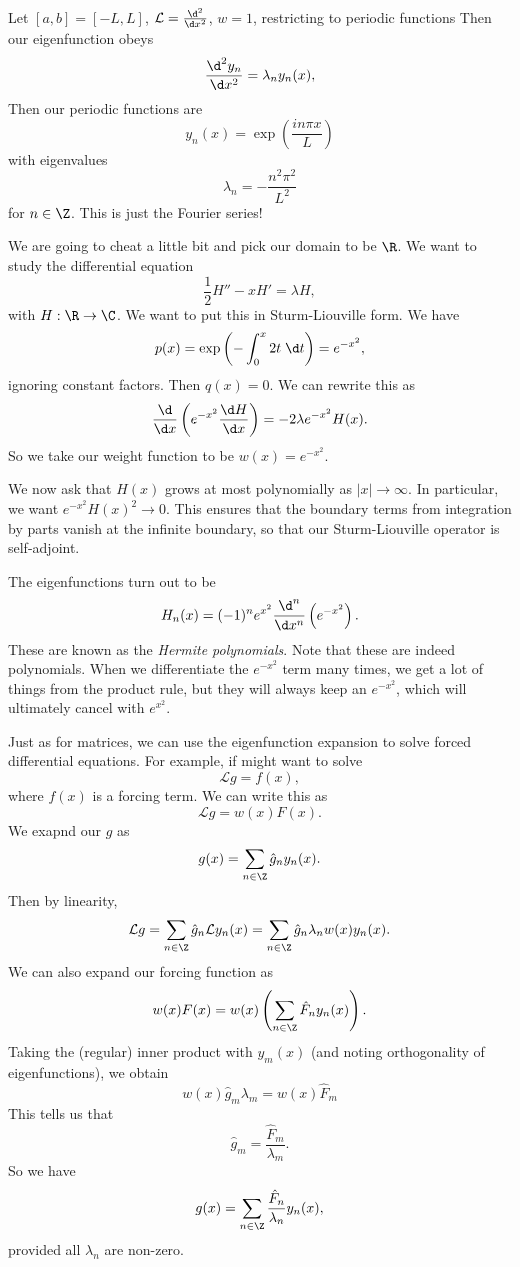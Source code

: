 \documentclass[a4paper]{article}
\begin{document}
\begin{eg}
  Let $[a, b] = [-L, L]$, $\mathcal{L} = \frac{\d^2}{\d x^2}$, $w = 1$, restricting to periodic functions Then our eigenfunction obeys
  \[
    \frac{\d^2 y_n}{\d x^2} = \lambda_n y_n(x),
  \]
  Then our periodic functions are
  \[
    y_n(x) = \exp\left(\frac{in\pi x}{L}\right)
  \]
  with eigenvalues
  \[
    \lambda_n = - \frac{n^2 \pi^2}{L^2}
  \]
  for $n \in \Z$. This is just the Fourier series!
\end{eg}

\begin{eg}
  We are going to cheat a little bit and pick our domain to be $\R$. We want to study the differential equation
  \[
    \frac{1}{2}H'' - xH' = \lambda H,
  \]
  with $H: \R \to \C$. We want to put this in Sturm-Liouville form. We have
  \[
    p(x) = \exp\left(-\int_0^x 2t \;\d t\right) = e^{-x^2},
  \]
  ignoring constant factors. Then $q(x) = 0$. We can rewrite this as
  \[
    \frac{\d}{\d x}\left(e^{-x^2}\frac{\d H}{\d x}\right) = -2\lambda e^{-x^2} H(x).
  \]
  So we take our weight function to be $w(x) = e^{-x^2}$.

  We now ask that $H(x)$ grows at most polynomially as $|x| \to \infty$. In particular, we want $e^{-x^2}H(x)^2 \to 0$. This ensures that the boundary terms from integration by parts vanish at the infinite boundary, so that our Sturm-Liouville operator is self-adjoint.

  The eigenfunctions turn out to be
  \[
    H_n(x) = (-1)^n e^{x^2}\frac{\d^n}{\d x^n}\left(e^{-x^2}\right).
  \]
  These are known as the \emph{Hermite polynomials}. Note that these are indeed polynomials. When we differentiate the $e^{-x^2}$ term many times, we get a lot of things from the product rule, but they will always keep an $e^{-x^2}$, which will ultimately cancel with $e^{x^2}$.
\end{eg}

Just as for matrices, we can use the eigenfunction expansion to solve forced differential equations. For example, if might want to solve
\[
  \mathcal{L} g = f(x),
\]
where $f(x)$ is a forcing term. We can write this as
\[
  \mathcal{L} g = w(x) F(x).
\]
We exapnd our $g$ as
\[
  g(x) = \sum_{n \in \Z}\hat{g}_n y_n(x).
\]
Then by linearity,
\[
  \mathcal{L}g = \sum_{n \in \Z}\hat{g}_n \mathcal{L} y_n(x) = \sum_{n \in \Z}\hat{g}_n \lambda_n w(x)y_n(x).
\]
We can also expand our forcing function as
\[
  w(x) F(x) = w(x) \left(\sum_{n \in \Z}\hat{F}_n y_n(x)\right).
\]
Taking the (regular) inner product with $y_m(x)$ (and noting orthogonality of eigenfunctions), we obtain
\[
  w(x) \hat{g}_m \lambda_m = w(x) \hat{F}_m
\]
This tells us that
\[
  \hat{g}_m = \frac{\hat{F}_m}{\lambda_m}.
\]
So we have
\[
  g(x) = \sum_{n \in \Z}\frac{\hat{F}_n}{\lambda_n}y_n(x),
\]
provided all $\lambda_n$ are non-zero.
\end{document}
